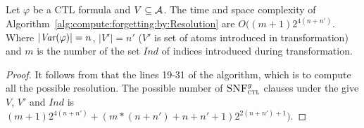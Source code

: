 \documentclass[letterpaper]{article} %
\begin{document}
\begin{proposition}
Let $\varphi$ be a CTL formula and $V \subseteq {\cal A}$.
The time and space complexity of Algorithm~\ref{alg:compute:forgetting:by:Resolution} are $O((m+1)2^{4(n+n')}$. Where $|\textit{Var}(\varphi)|=n$, $|V'|=n'$ ($V'$ is set of atoms introduced in transformation) and $m$ is the number of the set $Ind$ of indices introduced during transformation.
\end{proposition}
\begin{proof}
It follows from that the lines 19-31 of the algorithm, which is to compute all the possible resolution.
The possible number of ${\textsc{SNF}_{\textsc{ctl}}^g}$ clauses under the give $V$, $V'$ and $Ind$ is $(m+1)2^{4(n+n')}+(m*(n+n')+n+n'+1)2^{2(n+n')+1})$.
\end{proof}





\end{document}
